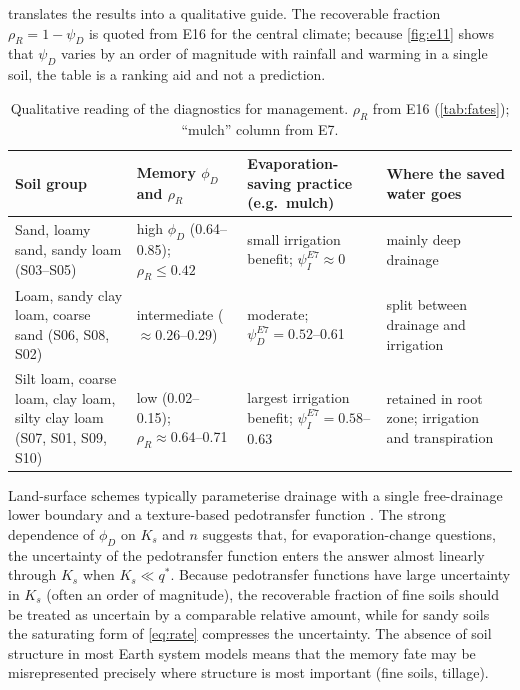  translates the results into a qualitative guide. The recoverable fraction $\rho_R=1-\psi_D$ is quoted from E16 for the central climate; because \cref{fig:e11} shows that $\psi_D$ varies by an order of magnitude with rainfall and warming in a single soil, the table is a ranking aid and not a prediction.
\begin{table}[H]\centering\small
\caption{Qualitative reading of the diagnostics for management. $\rho_R$ from E16 (\cref{tab:fates}); ``mulch'' column from E7.}
\label{tab:mgmt}
\begin{tabularx}{\textwidth}{>{\raggedright\arraybackslash}p{3.3cm}>{\raggedright\arraybackslash}X>{\raggedright\arraybackslash}X>{\raggedright\arraybackslash}X}
\toprule
Soil group & Memory $\phi_D$ and $\rho_R$ & Evaporation-saving practice (e.g.\ mulch) & Where the saved water goes\\\midrule
Sand, loamy sand, sandy loam (S03--S05) & high $\phi_D$ (0.64--0.85); $\rho_R\le0.42$ & small irrigation benefit; $\psi_I^{E7}\approx0$ & mainly deep drainage\\
Loam, sandy clay loam, coarse sand (S06, S08, S02) & intermediate ($\approx0.26$--0.29) & moderate; $\psi_D^{E7}=0.52$--0.61 & split between drainage and irrigation\\
Silt loam, coarse loam, clay loam, silty clay loam (S07, S01, S09, S10) & low (0.02--0.15); $\rho_R\approx0.64$--0.71 & largest irrigation benefit; $\psi_I^{E7}=0.58$--0.63 & retained in root zone; irrigation and transpiration\\\bottomrule
\end{tabularx}
\end{table}

Land-surface schemes typically parameterise drainage with a single free-drainage lower boundary and a texture-based pedotransfer function \citep{Vereecken2019,Weber2024}. The strong dependence of $\phi_D$ on $K_s$ and $n$ suggests that, for evaporation-change questions, the uncertainty of the pedotransfer function enters the answer almost linearly through $K_s$ when $K_s\ll q^\ast$. Because pedotransfer functions have large uncertainty in $K_s$ (often an order of magnitude), the recoverable fraction of fine soils should be treated as uncertain by a comparable relative amount, while for sandy soils the saturating form of \cref{eq:rate} compresses the uncertainty. The absence of soil structure in most Earth system models \citep{Fatichi2020} means that the memory fate may be misrepresented precisely where structure is most important (fine soils, tillage).

